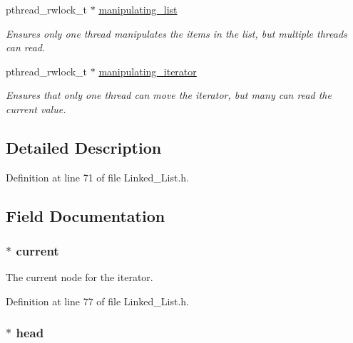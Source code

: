 \begin{DoxyCompactItemize}
pthread\+\_\+rwlock\+\_\+t $\ast$ \hyperlink{struct_linked___list__t_ad9a141f7ed99410b5961e2a2bf998f81}{manipulating\+\_\+list}
\begin{DoxyCompactList}\small\item\em Ensures only one thread manipulates the items in the list, but multiple threads can read. \end{DoxyCompactList}\item 
pthread\+\_\+rwlock\+\_\+t $\ast$ \hyperlink{struct_linked___list__t_ab73ab76aa0810bf72d2d60a1808f91c8}{manipulating\+\_\+iterator}
\begin{DoxyCompactList}\small\item\em Ensures that only one thread can move the iterator, but many can read the current value. \end{DoxyCompactList}\end{DoxyCompactItemize}


\subsection{Detailed Description}


Definition at line 71 of file Linked\+\_\+\+List.\+h.



\subsection{Field Documentation}
\hypertarget{struct_linked___list__t_abd89c0e7ede3521ca95bd5095a508543}{}
\subsubsection[{current}]{$\ast$ current}\label{struct_linked___list__t_abd89c0e7ede3521ca95bd5095a508543}


The current node for the iterator. 



Definition at line 77 of file Linked\+\_\+\+List.\+h.

\hypertarget{struct_linked___list__t_aab355c5320dd0e9b2522141171a933d2}{}
\subsubsection[{head}]{$\ast$ head}\label{struct_linked___list__t_aab355c5320dd0e9b2522141171a933d2}


